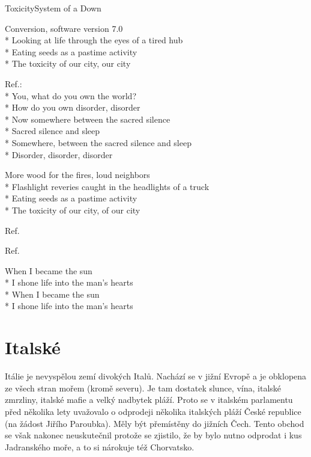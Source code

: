 \documentclass[10.5pt]{book}
\begin{document}
\begin{poem}{Toxicity}{System of a Down}

\settowidth{\versewidth}{Flashlight reveries caught in the headlights of a truck}

Conversion, software version 7.0\\*
Looking at life through the eyes of a tired hub\\*
Eating seeds as a pastime activity\\*
The toxicity of our city, our city

Ref.:\\*
You, what do you own the world?\\*
How do you own disorder, disorder\\*
Now somewhere between the sacred silence\\*
Sacred silence and sleep\\*
Somewhere, between the sacred silence and sleep\\*
Disorder, disorder, disorder

More wood for the fires, loud neighbors\\*
Flashlight reveries caught in the headlights of a truck\\*
Eating seeds as a pastime activity\\*
The toxicity of our city, of our city

Ref.

Ref.

When I became the sun\\*
I shone life into the man's hearts\\*
When I became the sun\\*
I shone life into the man's hearts

\end{poem}

\section{Italské}

Itálie je nevyspělou zemí divokých Italů. Nachází se v jižní Evropě a je
obklopena ze všech stran mořem (kromě severu). Je tam dostatek slunce, vína,
italské zmrzliny, italské mafie a velký nadbytek pláží. Proto se v italském
parlamentu před několika lety uvažovalo o odprodeji několika italských pláží
České republice (na žádost Jiřího Paroubka). Měly být přemístěny do jižních
Čech. Tento obchod se však nakonec neuskutečnil protože se zjistilo, že by bylo
nutno odprodat i kus Jadranského moře, a to si nárokuje též Chorvatsko. 
\end{document}
